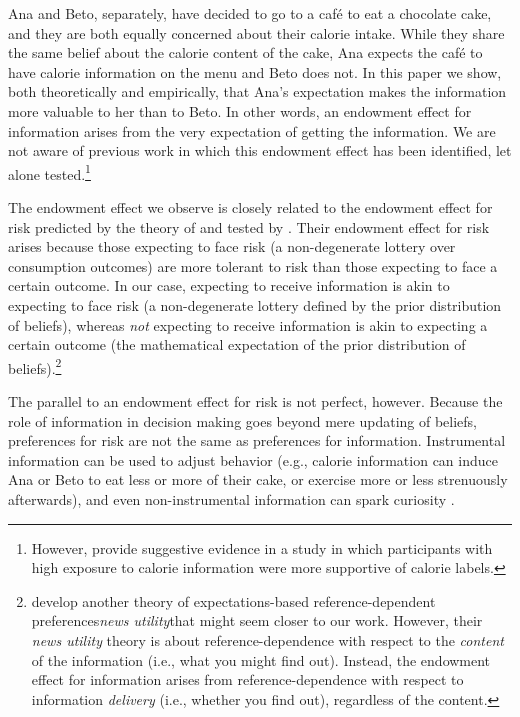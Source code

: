 Ana and Beto, separately, have decided to go to a café to eat a chocolate cake, and they are both equally concerned about their calorie intake. While they share the same belief about the calorie content of the cake, Ana expects the café to have calorie information on the menu and Beto does not. In this paper we show, both theoretically and empirically, that Ana’s expectation makes the information more valuable to her than to Beto.  In other words, an endowment effect for information arises from the very expectation of getting the information. We are not aware of previous work in which this endowment effect has been identified, let alone tested.\footnote{However, \citet{cawleyImpactInformationDisclosure} provide suggestive evidence in a study in which participants with high exposure to calorie information were more supportive of calorie labels.}

The endowment effect we observe is closely related to the endowment effect for risk predicted by the theory of \citet{koszegiReferenceDependentRiskAttitudes2007} and tested by \citet{sprengerEndowmentEffectRisk2015}. Their endowment effect for risk arises because those expecting to face risk (a non-degenerate lottery over consumption outcomes) are more tolerant to risk than those expecting to face a certain outcome. In our case, expecting to receive information is akin to expecting to face risk (a non-degenerate lottery defined by the prior distribution of beliefs), whereas \emph{not} expecting to receive information is akin to expecting a certain outcome (the mathematical expectation of the prior distribution of beliefs).\footnote{\citet{koszegiReferenceDependentConsumptionPlans2009} develop another theory of expectations-based reference-dependent preferences\textemdash\emph{news utility}\textemdash that might seem closer to our work. However, their \emph{news utility} theory is about reference-dependence with respect to the \emph{content} of the information (i.e., what you might find out). Instead, the endowment effect for information arises from reference-dependence with respect to information \emph{delivery} (i.e., whether you find out), regardless of the content.}

The parallel to an endowment effect for risk is not perfect, however. Because the role of information in decision making goes beyond mere updating of beliefs, preferences for risk are not the same as preferences for information. Instrumental information can be used to adjust behavior (e.g., calorie information can induce Ana or Beto to eat less or more of their cake, or exercise more or less strenuously afterwards), and even non-instrumental information can spark curiosity \citep{loewensteinPsychologyCuriosityReview1994,sharotHowPeopleDecide2020}.

